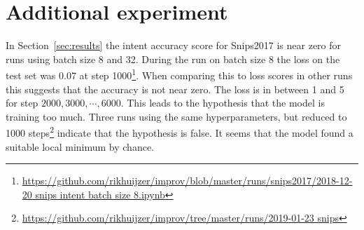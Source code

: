 \iffalse
The code has used the workaround presented by~\citet{lakshmanan2018tpu}.
The workaround increased running time for the following reason.
For each intermediate result (each point in the plot) the occurring actions are as follows.
\begin{enumerate}
    \item Transfer model checkpoint from TPU to Google Bucket.
    \item Shutdown TPU.
    \item Initialize TPU.
    \item Transfer model checkpoint from Google Bucket to TPU.
    \item Evaluate.
    \item Transfer model checkpoint from TPU to Google Bucket.
    \item Shutdown TPU.
    \item Initialize TPU.
    \item Transfer model checkpoint from Google Bucket to TPU.
\end{enumerate}
The shutdown and initialization takes about 30 seconds.
Transferring data (around 1.2 GB) takes about 10 seconds.
Hence, calculating one intermediate result takes about one and a half minute.
Note that this can not be optimalized by running evaluation on the Google Colab machine (CPU) since it will run out of memory.
(For a local machine with 16 GB RAM evaluation or `inference' on \bert{base} is possible and requires only a few minutes when setting batch size to 16.)
This workaround made the code more complex and execution slower which hindered the experiments.
So, it was decided to stop using the workaround.
\fi

\section{Additional experiment}
\label{sec:additional_experiments}
In Section~\ref{sec:results} the intent accuracy score for Snips2017 is near zero for runs using batch size 8 and 32.
During the run on batch size 8 the loss on the test set was 0.07 at step 1000\footnote{\url{https://github.com/rikhuijzer/improv/blob/master/runs/snips2017/2018-12-20 snips intent batch size 8.ipynb}}.
When comparing this to loss scores in other runs this suggests that the accuracy is not near zero.
The loss is in between 1 and 5 for step $2000, 3000, \cdots, 6000$.
This leads to the hypothesis that the model is training too much.
Three runs using the same hyperparameters, but reduced to 1000 steps\footnote{\url{https://github.com/rikhuijzer/improv/tree/master/runs/2019-01-23 snips}} indicate that the hypothesis is false.
It seems that the model found a suitable local minimum by chance.
